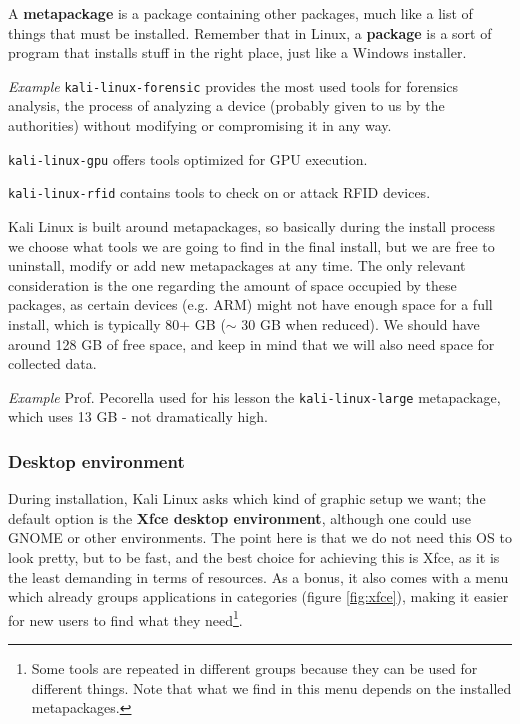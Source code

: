 A \textbf{metapackage} is a package containing other packages, much like a list of things that must be installed. Remember that in Linux, a \textbf{package} is a sort of program that installs stuff in the right place, just like a Windows installer.

\vspace{0.5em}

\emph{Example} \texttt{kali-linux-forensic} provides the most used tools for forensics analysis, the process of analyzing a device (probably given to us by the authorities) without modifying or compromising it in any way.

\texttt{kali-linux-gpu} offers tools optimized for GPU execution.

\texttt{kali-linux-rfid} contains tools to check on or attack RFID devices.

\vspace{0.5em}
 
Kali Linux is built around metapackages, so basically during the install process we choose what tools we are going to find in the final install, but we are free to uninstall, modify or add new metapackages at any time. The only relevant consideration is the one regarding the amount of space occupied by these packages, as certain devices (e.g. ARM) might not have enough space for a full install, which is typically 80+ GB ($\sim$ 30 GB when reduced). We should have around 128 GB of free space, and keep in mind that we will also need space for collected data.

\vspace{0.5em}

\emph{Example} Prof. Pecorella used for his lesson the \texttt{kali-linux-large} metapackage, which uses 13 GB - not dramatically high.


\subsubsection*{Desktop environment}
During installation, Kali Linux asks which kind of graphic setup we want; the default option is the \textbf{Xfce desktop environment}, although one could use GNOME or other environments. The point here is that we do not need this OS to look pretty, but to be fast, and the best choice for achieving this is Xfce, as it is the least demanding in terms of resources. As a bonus, it also comes with a menu which already groups applications in categories (figure \ref{fig:xfce}), making it easier for new users to find what they need\footnote{Some tools are repeated in different groups because they can be used for different things. Note that what we find in this menu depends on the installed metapackages.}.

